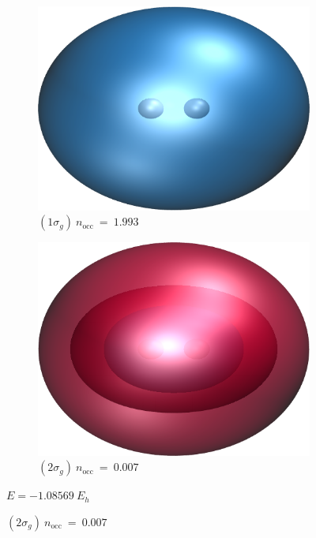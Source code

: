 \documentclass[aps,prb,reprint,showkeys,superscriptaddress]{revtex4-1}
\begin{document}
\begin{figure}
  \begin{subfigure}[l]{0.45\linewidth}
    \includegraphics[width=0.75\linewidth]{Figures/h2_HF_mo1.cube.png}
    \caption*{\centering $(1\sigma_g)~n_\text{occ}~=~1.993$}
  \end{subfigure}
  \begin{subfigure}[r]{0.45\linewidth}
    \includegraphics[width=0.75\linewidth]{Figures/h2_HF_mo3.cube.png}
    \caption*{\centering $(2\sigma_g)~n_\text{occ}~=~0.007$}
  \end{subfigure}
  $E=-1.08569~E_h$
  

\end{figure}
\end{document}
